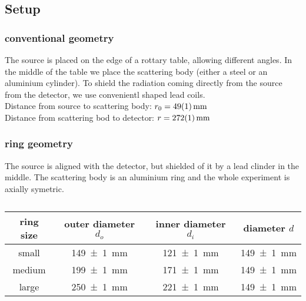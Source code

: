 \documentclass[a4paper,12pt]{article}
\begin{document}
\subsection{Setup}

\subsubsection{conventional geometry}
The source is placed on the edge of a rottary table, allowing different angles. In the middle of the table we place the scattering body (either a steel or an aluminium cylinder). To shield the radiation coming directly from the source from the detector, we use convenientl shaped lead coils.\\
Distance from source to scattering body: $r_0 = \SI{49+-1}{mm}$\\
Distance from scattering bod to detector: $r = \SI{272+-1}{mm}$\\

\subsubsection{ring geometry}
The source is aligned with the detector, but shielded of it by a lead clinder in the middle. The scattering body is an aluminium ring and the whole experiment is axially symetric.

\begin{table}[H]
	\renewcommand{\arraystretch}{1.5}
	\centering
	\begin{tabular}{|c|c|c|c|}
		\hline
		ring size & outer diameter $d_o$ & inner diameter $d_i$ & diameter $d$ \\
		\hline
		small & \SI{149+-1}{mm} & \SI{121+-1}{mm} & \SI{149+-1}{mm} \\
		\hline
		medium & \SI{199+-1}{mm} & \SI{171+-1}{mm} & \SI{149+-1}{mm} \\
		\hline
		large & \SI{250+-1}{mm} & \SI{221+-1}{mm} & \SI{149+-1}{mm} \\
		\hline
	\end{tabular}
	\caption{ }
	\label{tab:probes }
\end{table}
\end{document}
